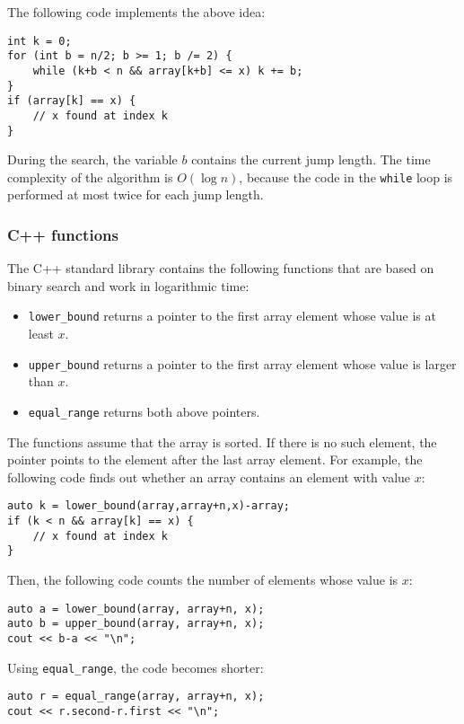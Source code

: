 The following code implements the above idea:
\begin{lstlisting}
int k = 0;
for (int b = n/2; b >= 1; b /= 2) {
    while (k+b < n && array[k+b] <= x) k += b;
}
if (array[k] == x) {
    // x found at index k
}
\end{lstlisting}

During the search, the variable $b$
contains the current jump length.
The time complexity of the algorithm is $O(\log n)$,
because the code in the \texttt{while} loop
is performed at most twice for each jump length.

\subsubsection{C++ functions}

The C++ standard library contains the following functions
that are based on binary search and work in logarithmic time:

\begin{itemize}
\item \texttt{lower\_bound} returns a pointer to the
first array element whose value is at least $x$.
\item \texttt{upper\_bound} returns a pointer to the
first array element whose value is larger than $x$.
\item \texttt{equal\_range} returns both above pointers.
\end{itemize}

The functions assume that the array is sorted.
If there is no such element, the pointer points to
the element after the last array element.
For example, the following code finds out whether
an array contains an element with value $x$:

\begin{lstlisting}
auto k = lower_bound(array,array+n,x)-array;
if (k < n && array[k] == x) {
    // x found at index k
}
\end{lstlisting}

Then, the following code counts the number of elements
whose value is $x$:

\begin{lstlisting}
auto a = lower_bound(array, array+n, x);
auto b = upper_bound(array, array+n, x);
cout << b-a << "\n";
\end{lstlisting}

Using \texttt{equal\_range}, the code becomes shorter:

\begin{lstlisting}
auto r = equal_range(array, array+n, x);
cout << r.second-r.first << "\n";
\end{lstlisting}


